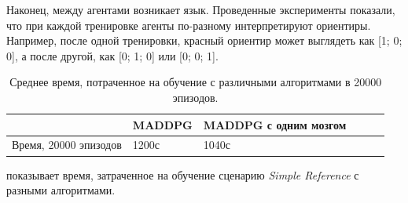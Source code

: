 Наконец, между агентами возникает язык. Проведенные эксперименты показали, что при каждой тренировке агенты по-разному интерпретируют ориентиры. Например, после одной тренировки, красный ориентир может выглядеть как [1; 0; 0], а после другой, как [0; 1; 0] или [0; 0; 1].

\begin{table}[t!]
	\centering\small
	\caption{Среднее время, потраченное на обучение с различными алгоритмами в 20000 эпизодов.}
	\label{tab-sr-time}
	\begin{tabular}{|l|l|l|l|l|l|}
		\hline
		&MADDPG&MADDPG с одним мозгом\\
		\hline
		Время, 20000 эпизодов&1200с&1040с\\ \hline
	\end{tabular}
	\normalsize%
\end{table}

 показывает время, затраченное на обучение сценарию \textit{Simple Reference} с разными алгоритмами.
